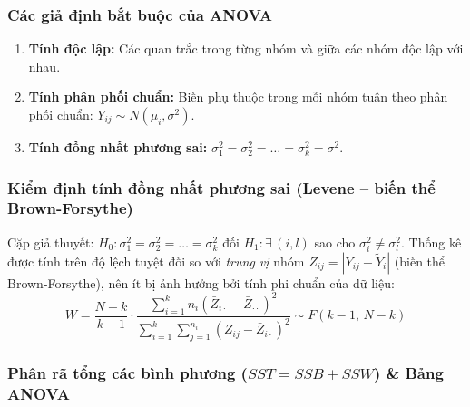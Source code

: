 \documentclass[12pt,a4paper]{article}
\begin{document}
\subsubsection{Các giả định bắt buộc của ANOVA}
\begin{enumerate}
  \item \textbf{Tính độc lập:} Các quan trắc trong từng nhóm và giữa các nhóm độc lập với nhau.
  \item \textbf{Tính phân phối chuẩn:} Biến phụ thuộc trong mỗi nhóm tuân theo phân phối chuẩn:
  $Y_{ij} \sim N(\mu_i, \sigma^2)$.
  \item \textbf{Tính đồng nhất phương sai:} $\sigma_1^2 = \sigma_2^2 = \dots = \sigma_k^2 = \sigma^2$.
\end{enumerate}

\subsubsection{Kiểm định tính đồng nhất phương sai (Levene -- biến thể Brown-Forsythe)}

Cặp giả thuyết: $H_0: \sigma_1^2 = \sigma_2^2 = \dots = \sigma_k^2$ đối
$H_1: \exists\,(i,l)$ sao cho $\sigma_i^2 \ne \sigma_l^2$. Thống kê được tính trên độ lệch tuyệt
đối so với \emph{trung vị} nhóm $Z_{ij} = |Y_{ij} - \tilde{Y}_i|$ (biến thể Brown-Forsythe), nên ít bị ảnh hưởng bởi tính phi chuẩn của dữ liệu:
\begin{equation}
  W = \frac{N-k}{k-1}\cdot
      \frac{\sum_{i=1}^{k} n_i(\bar{Z}_{i\cdot} - \bar{Z}_{\cdot\cdot})^2}
           {\sum_{i=1}^{k}\sum_{j=1}^{n_i}(Z_{ij} - \bar{Z}_{i\cdot})^2}
  \sim F(k-1,\, N-k)
\end{equation}

\subsubsection{Phân rã tổng các bình phương ($SST = SSB + SSW$) \& Bảng ANOVA}
\end{document}

